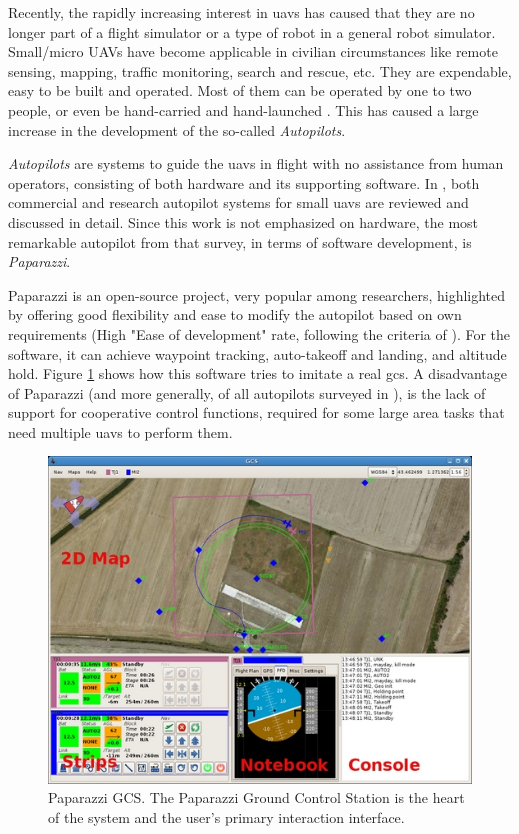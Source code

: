 Recently, the rapidly increasing interest in \glspl{uav} has caused that they are no longer part of a flight simulator or a type of robot in a general robot simulator. Small/micro UAVs have become applicable in civilian circumstances like remote sensing, mapping, traffic monitoring, search and rescue, etc. They are expendable, easy to be built and operated. Most of them can be operated by one to two people, or even be hand-carried and hand-launched \cite{roadmap2002roadmap,wu2004micro}. This has caused a large increase in the development of the so-called \emph{Autopilots}.

\emph{Autopilots} are systems to guide the \glspl{uav} in flight with no assistance from human operators, consisting of both hardware and its supporting software. In \cite{chao2010autopilots}, both commercial and research autopilot systems for small \glspl{uav} are reviewed and discussed in detail. Since this work is not emphasized on hardware, the most remarkable autopilot from that survey, in terms of software development, is \emph{Paparazzi}.

Paparazzi \cite{brisset2006paparazzi} is an open-source project, very popular among researchers, highlighted by offering good flexibility and ease to modify the autopilot based on own requirements (High "Ease of development" rate, following the criteria of \cite{alexander2005gaming}). For the software, it can achieve waypoint tracking, auto-takeoff and landing, and altitude hold. Figure \ref{fig:paparazziGCS} shows how this software tries to imitate a real \gls{gcs}. A disadvantage of Paparazzi (and more generally, of all autopilots surveyed in \cite{chao2010autopilots}), is the lack of support for cooperative control functions, required for some large area tasks that need multiple \glspl{uav} to perform them.

\begin{figure}[hbt]
	\includegraphics[width=\textwidth]{./Figures/PaparazziGCS.jpg}
	\centering
	\caption{Paparazzi GCS. The Paparazzi Ground Control Station is the heart of the system and the user's primary interaction interface.}
	\label{fig:paparazziGCS}
\end{figure}

